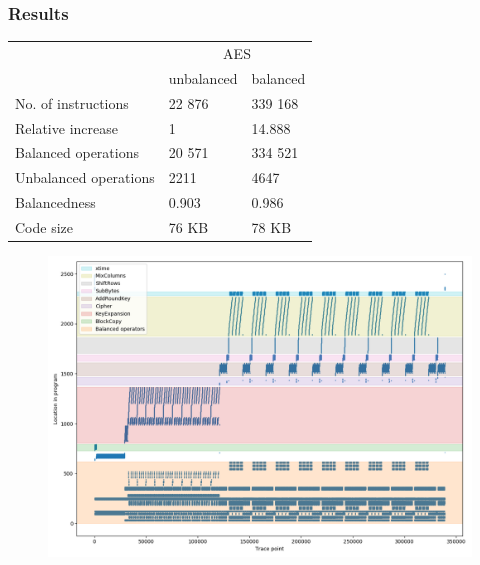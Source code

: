 \documentclass[11pt,t,usepdftitle=false,aspectratio=169]{beamer}
\begin{document}
\begin{frame}[label=results]
  \frametitle{Results}
  \center
  \vfill
  \begin{tabular}{|l|l|l|}
    \hline
    & \multicolumn{2}{c|}{AES} \\
    \cline{2-3}
    & unbalanced & balanced \\
    \cline{2-3}
    No. of instructions & 22 876 & 339 168 \\
    Relative increase & 1 & 14.888 \\
    Balanced operations & 20 571 & 334 521 \\
    Unbalanced operations & 2211 & 4647 \\
    Balancedness      & 0.903 & 0.986 \\
    Code size         & 76 KB & 78 KB \\
    \hline
  \end{tabular}
  \vfill
\end{frame}

\begin{frame}
  \begin{figure}
    \centering
    \includegraphics[height=\textheight]{aes-parts.png}
  \end{figure}
\end{frame}
\end{document}
